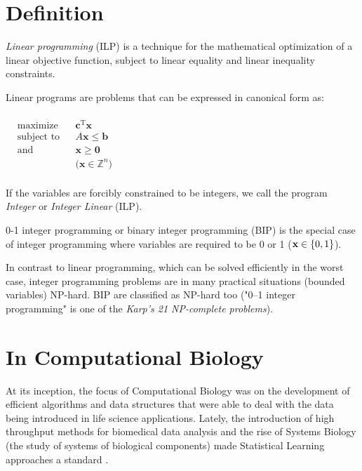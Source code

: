 \section{Definition} 
\textit{Linear programming} (ILP) is a technique for the mathematical optimization of a linear objective function, subject to linear equality and linear inequality constraints.

Linear programs are problems that can be expressed in canonical form as:
\paragraph{}

${\displaystyle {\begin{aligned}
	&{\text{maximize}}&&\mathbf {c} ^{\mathrm {T} }\mathbf {x}
	\\&{\text{subject to}}&&A\mathbf {x} \leq \mathbf {b}
	\\&{\text{and}}&&\mathbf {x} \geq \mathbf {0}
	\\&&&{\text{(}}\mathbf {x} \in \mathbb {Z} ^{n}\text{)}
	\\&
	\end{aligned}}} $


If the variables are forcibly constrained to be integers, we call the program \textit{Integer} or \textit{Integer Linear} (ILP).

0-1 integer programming or binary integer programming (BIP) is the special case of integer programming where variables are required to be 0 or 1 ($\mathbf {x} \in \mathbb \{0,1\} $).

In contrast to linear programming, which can be solved efficiently in the worst case, integer programming problems are in many practical situations (bounded variables) NP-hard. BIP are classified as NP-hard too ("0–1 integer programming" is one of the \textit{Karp's 21 NP-complete problems}).

\section{In Computational Biology}

At its inception, the focus of Computational Biology was on the development of efficient algorithms and data structures that were able to deal with the data being introduced in life science applications. Lately, the introduction of high throughput methods for biomedical data analysis and the rise of Systems Biology (the study of systems of biological components) made Statistical Learning approaches a standard \cite{ilpinb}.

